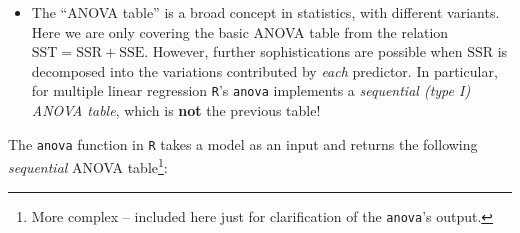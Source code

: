 \documentclass[]{book}
\let\rmarkdownfootnote\footnote%
\def\footnote{\protect\rmarkdownfootnote}
\newenvironment{rmdblock}[1]
  {\begin{shaded*}
  \begin{itemize}
  \renewcommand{\labelitemi}{
    \raisebox{-.7\height}[0pt][0pt]{
      {\setkeys{Gin}{width=2em,keepaspectratio}\texttt{[image: img/icons/\#1]}}
    }
  }
  \item
  }
  {
  \end{itemize}
  \end{shaded*}
  }
\newenvironment{rmdcaution}
  {\begin{rmdblock}{caution}}
  {\end{rmdblock}}
\theoremstyle{definition}
\theoremstyle{definition}
\theoremstyle{definition}
\theoremstyle{remark}
\begin{document}
\begin{rmdcaution}
The ``ANOVA table'' is a broad concept in statistics, with different
variants. Here we are only covering the basic ANOVA table from the
relation \(\text{SST} = \text{SSR} + \text{SSE}\). However, further
sophistications are possible when \(\text{SSR}\) is decomposed into the
variations contributed by \emph{each} predictor. In particular, for
multiple linear regression \texttt{R}'s \texttt{anova} implements a
\emph{sequential (type I) ANOVA table}, which is \textbf{not} the
previous table!
\end{rmdcaution}

The \texttt{anova} function in \texttt{R} takes a model as an input and
returns the following \emph{sequential} ANOVA table\footnote{More
  complex -- included here just for clarification of the
  \texttt{anova}'s output.}:
\end{document}
